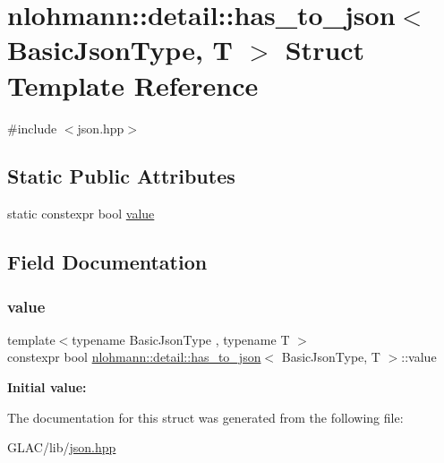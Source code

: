 \hypertarget{structnlohmann_1_1detail_1_1has__to__json}{}\section{nlohmann\+::detail\+::has\+\_\+to\+\_\+json$<$ Basic\+Json\+Type, T $>$ Struct Template Reference}
\label{structnlohmann_1_1detail_1_1has__to__json}


{\ttfamily \#include $<$json.\+hpp$>$}

\subsection*{Static Public Attributes}
\begin{DoxyCompactItemize}
\item 
static constexpr bool \mbox{\hyperlink{structnlohmann_1_1detail_1_1has__to__json_a18e260c3c6f10328637c4427d3cb3a31}{value}}
\end{DoxyCompactItemize}


\subsection{Field Documentation}
\mbox{\label{structnlohmann_1_1detail_1_1has__to__json_a18e260c3c6f10328637c4427d3cb3a31}} 
\subsubsection{\texorpdfstring{value}{value}}
{\footnotesize\ttfamily template$<$typename Basic\+Json\+Type , typename T $>$ \\
constexpr bool \mbox{\hyperlink{structnlohmann_1_1detail_1_1has__to__json}{nlohmann\+::detail\+::has\+\_\+to\+\_\+json}}$<$ Basic\+Json\+Type, T $>$\+::value\hspace{0.3cm}{\ttfamily [static]}}

{\bfseries Initial value\+:}
\begin{DoxyCode}{0}

\end{DoxyCode}


The documentation for this struct was generated from the following file\+:\begin{DoxyCompactItemize}
\item 
G\+L\+A\+C/lib/\mbox{\hyperlink{json_8hpp}{json.\+hpp}}\end{DoxyCompactItemize}
